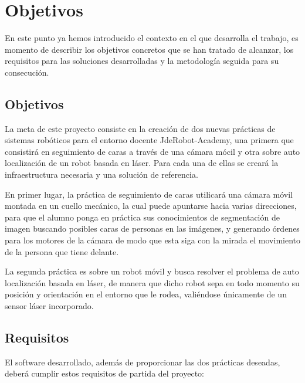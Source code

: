 \chapter{Objetivos}\label{cap.objetivos}
En este punto ya hemos introducido el contexto en el que desarrolla el trabajo, es momento de describir los objetivos concretos que se han tratado de alcanzar, los requisitos para las soluciones desarrolladas y la metodología seguida para su consecución.

\section{Objetivos}
La meta de este proyecto consiste en la creación de dos nuevas prácticas de sistemas robóticos para el entorno docente JdeRobot-Academy, una primera que consistirá en seguimiento de caras a través de una cámara mócil y otra sobre auto localización de un robot basada en láser. Para cada una de ellas se creará la infraestructura necesaria y una solución de referencia.

En primer lugar, la práctica de seguimiento de caras utilicará una cámara móvil montada en un cuello mecánico, la cual puede apuntarse hacia varias direcciones, para que el alumno ponga en práctica sus conocimientos de segmentación de imagen buscando posibles caras de personas en las imágenes, y generando órdenes para los motores de la cámara de modo que esta siga con la mirada el movimiento de la persona que tiene delante.

La segunda práctica es sobre un robot móvil y busca resolver el problema de auto localización basada en láser, de manera que dicho robot sepa en todo momento su posición y orientación en el entorno que le rodea, valiéndose únicamente de un sensor láser incorporado.

\section{Requisitos} 
El software desarrollado, además de proporcionar las dos prácticas deseadas, deberá cumplir estos requisitos de partida del proyecto:

